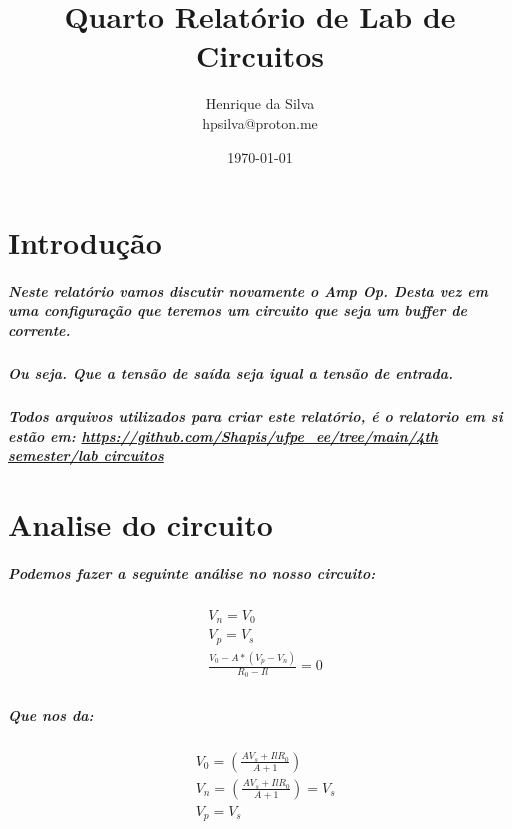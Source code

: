 \documentclass[12pt,twoside, a4paper, twocolumn]{article}
\title{Quarto Relatório de Lab de Circuitos}
\author{Henrique da Silva \\ hpsilva@proton.me}
\date{\today}
\begin{document}
\maketitle
{}
\newpage
\tableofcontents
\newpage



\section{Introdução}

\subparagraph*{Neste relatório vamos discutir novamente o Amp Op. Desta vez em uma configuração que teremos um circuito que seja um \emph{buffer de corrente}. }

\subparagraph*{Ou seja. Que a tensão de saída seja igual a tensão de entrada.}


\subparagraph*{Todos arquivos utilizados para criar este relatório, é o relatorio em si estão em:  \url{https://github.com/Shapis/ufpe_ee/tree/main/4th semester/lab circuitos}}


\section{Analise do circuito}

\subparagraph*{Podemos fazer a seguinte análise no nosso circuito:}

\begin{equation}
    \begin{aligned}
         & V_n                                   = V_0 \\
         & V_p                                   = V_s \\
         & \frac{V_0 - A*(V_p - V_n)}{R_0 - Il}  = 0   \\
    \end{aligned}
\end{equation}

\subparagraph*{Que nos da:}


\begin{equation}
    \begin{aligned}
         & V_0 = \left(\frac{A V_s + Il R_0}{A+1}\right)                                         \\
         & V_n =          \left(\frac{A V_s + Il R_0}{A+1}\right)                          = V_s \\
         & V_p  = V_s                                                                            \\
    \end{aligned}
\end{equation}
\end{document}
